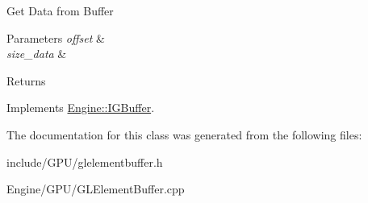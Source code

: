 Get Data from Buffer 
\begin{DoxyParams}{Parameters}
{\em offset} & \\
\hline
{\em size\+\_\+data} & \\
\hline
\end{DoxyParams}
\begin{DoxyReturn}{Returns}

\end{DoxyReturn}


Implements \hyperlink{classEngine_1_1IGBuffer_a8ad52dc670797d72aabf99033d20b220}{Engine\+::\+I\+G\+Buffer}.



The documentation for this class was generated from the following files\+:\begin{DoxyCompactItemize}
\item 
include/\+G\+P\+U/glelementbuffer.\+h\item 
Engine/\+G\+P\+U/G\+L\+Element\+Buffer.\+cpp\end{DoxyCompactItemize}
